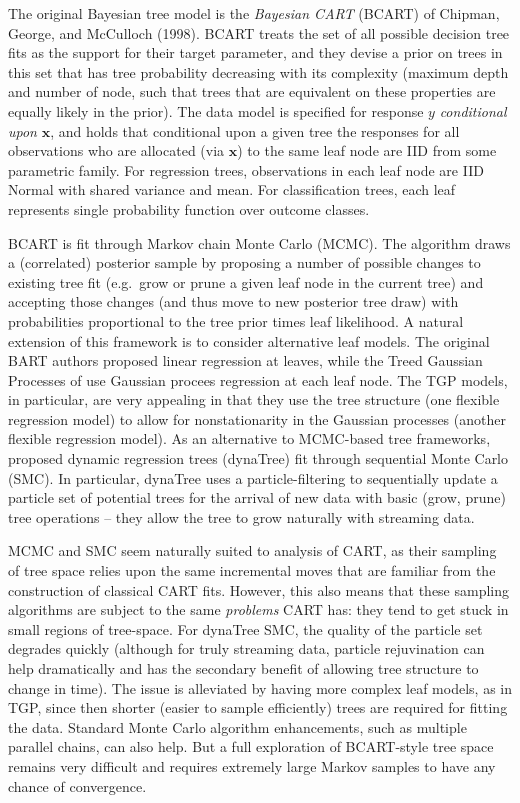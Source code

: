 \documentclass{article}
\begin{document}
The original Bayesian tree model is the \emph{Bayesian CART} (BCART) of
Chipman, George, and McCulloch (1998). BCART treats the set of all
possible decision tree fits as the support for their target parameter,
and they devise a prior on trees in this set that has tree probability
decreasing with its complexity (maximum depth and number of node, such
that trees that are equivalent on these properties are equally likely in
the prior). The data model is specified for response $y$
\emph{conditional upon} $\mathbf{x}$, and holds that conditional upon a
given tree the responses for all observations who are allocated (via
$\mathbf{x}$) to the same leaf node are IID from some parametric family.
For regression trees, observations in each leaf node are IID Normal with
shared variance and mean. For classification trees, each leaf represents
single probability function over outcome classes.

BCART is fit through Markov chain Monte Carlo (MCMC). The algorithm
draws a (correlated) posterior sample by proposing a number of possible
changes to existing tree fit (e.g.~grow or prune a given leaf node in
the current tree) and accepting those changes (and thus move to new
posterior tree draw) with probabilities proportional to the tree prior
times leaf likelihood. A natural extension of this framework is to
consider alternative leaf models. The original BART authors proposed
linear regression at leaves, while the Treed Gaussian Processes of
\cite{gramacy_bayesian_2008} use Gaussian procees regression at each
leaf node. The TGP models, in particular, are very appealing in that
they use the tree structure (one flexible regression model) to allow for
nonstationarity in the Gaussian processes (another flexible regression
model). As an alternative to MCMC-based tree frameworks,
\cite{taddy_dynamic_2011} proposed dynamic regression trees (dynaTree)
fit through sequential Monte Carlo (SMC). In particular, dynaTree uses a
particle-filtering to sequentially update a particle set of potential
trees for the arrival of new data with basic (grow, prune) tree
operations -- they allow the tree to grow naturally with streaming data.

MCMC and SMC seem naturally suited to analysis of CART, as their
sampling of tree space relies upon the same incremental moves that are
familiar from the construction of classical CART fits. However, this
also means that these sampling algorithms are subject to the same
\emph{problems} CART has: they tend to get stuck in small regions of
tree-space. For dynaTree SMC, the quality of the particle set degrades
quickly (although for truly streaming data, particle rejuvination can
help dramatically and has the secondary benefit of allowing tree
structure to change in time). The issue is alleviated by having more
complex leaf models, as in TGP, since then shorter (easier to sample
efficiently) trees are required for fitting the data. Standard Monte
Carlo algorithm enhancements, such as multiple parallel chains, can also
help. But a full exploration of BCART-style tree space remains very
difficult and requires extremely large Markov samples to have any chance
of convergence.
\end{document}
